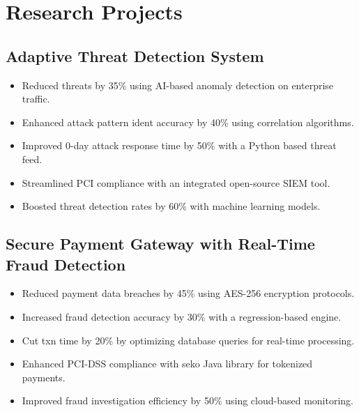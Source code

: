 
\section{Research Projects} \vspace{0.1cm}

\subsection{Adaptive Threat Detection System} \vspace{0.1cm}
\begin{itemize}
	\item[\textrightarrow] Reduced threats by 35\% using AI-based anomaly detection on enterprise traffic. \vspace{0.08cm}
	\item[\textrightarrow] Enhanced attack pattern ident accuracy by 40\% using correlation algorithms. \vspace{0.08cm}
	\item[\textrightarrow] Improved 0-day attack response time by 50\% with a Python based threat feed. \vspace{0.08cm}
	\item[\textrightarrow] Streamlined PCI compliance with an integrated open-source SIEM tool. \vspace{0.08cm}
	\item[\textrightarrow] Boosted threat detection rates by 60\% with machine learning models. \vspace{0.08cm}
\end{itemize}

\subsection{Secure Payment Gateway with Real-Time Fraud Detection} \vspace{0.1cm}
\begin{itemize}
	\item[\textrightarrow] Reduced payment data breaches by 45\% using AES-256 encryption protocols. \vspace{0.08cm}
	\item[\textrightarrow] Increased fraud detection accuracy by 30\% with a regression-based engine. \vspace{0.08cm}
	\item[\textrightarrow] Cut txn time by 20\% by optimizing database queries for real-time processing. \vspace{0.08cm}
	\item[\textrightarrow] Enhanced PCI-DSS compliance with seko Java library for tokenized payments. \vspace{0.08cm}
	\item[\textrightarrow] Improved fraud investigation efficiency by 50\% using cloud-based monitoring. \vspace{0.08cm}
\end{itemize}
